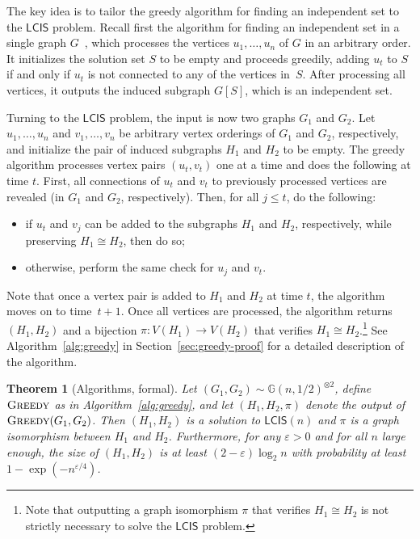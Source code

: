 \documentclass[11pt]{article}
\theoremstyle{plain}
\newtheorem{theorem}{Theorem}
\theoremstyle{definition}
\theoremstyle{remark}
\newcommand{\Gnhalf}{\mathbb{G}(n,1/2)}
\newcommand{\greedy}{\textsc{Greedy} }
\newcommand{\eps}{\varepsilon}
\newcommand{\MCS}{\mathsf{LCIS}}
\begin{document}
 
The key idea is to tailor the greedy algorithm for finding an independent set to the $\MCS$ problem. 
Recall first the algorithm for finding an independent set in a single graph $G$~\cite{grimmett1975colouring,Kar76}, 
which processes the vertices $u_{1}, \ldots, u_{n}$ of $G$ in an arbitrary order. It initializes the solution set $S$ to be empty and proceeds greedily, adding $u_{t}$ to $S$ if and only if $u_{t}$ is not connected to any of the vertices in~$S$. 
After processing all vertices, it outputs the induced subgraph $G[S]$, which is an independent set. 

Turning to the $\MCS$ problem, the input is now two graphs $G_{1}$ and $G_{2}$. 
Let $u_{1}, \ldots, u_{n}$ and 
$v_{1}, \ldots, v_{n}$ be arbitrary vertex orderings of $G_{1}$ and $G_{2}$, respectively, 
and initialize the pair of induced subgraphs $H_{1}$ and $H_{2}$ to be empty. 
The greedy algorithm processes vertex pairs $(u_{t}, v_{t})$ one at a time and does the following at time $t$. 
First, all connections of $u_{t}$ and $v_{t}$ to previously processed vertices are revealed (in $G_{1}$ and $G_{2}$, respectively). 
Then, for all $j \leq t$, do the following: 
\begin{itemize}
    \item if $u_t$ and $v_j$ can be added to the subgraphs $H_1$ and $H_2$, respectively, while preserving $H_1 \cong H_2$, then do so; 
    \item otherwise, perform the same check for $u_{j}$ and $v_{t}$.
\end{itemize}
Note that once a vertex pair is added to $H_{1}$ and $H_{2}$ at time $t$, 
the algorithm moves on to time~$t+1$. 
Once all vertices are processed, the algorithm returns $(H_{1}, H_{2})$ and a bijection $\pi : V(H_{1}) \to V(H_{2})$ 
that verifies $H_{1} \cong H_{2}$.\footnote{Note that outputting a graph isomorphism $\pi$ that verifies $H_{1} \cong H_{2}$ is not strictly necessary to solve the $\MCS$ problem.}
See Algorithm~\ref{alg:greedy} in Section~\ref{sec:greedy-proof} for a detailed description of the algorithm. 



\begin{theorem}[Algorithms, formal]\label{thm:algs-formal}
    Let $(G_1, G_2) \sim \Gnhalf^{\otimes 2}$, define $\greedy$  as in Algorithm~\ref{alg:greedy}, 
    and let $(H_1, H_2, \pi)$ denote the output of $\greedy(G_1, G_2)$. 
    Then $(H_1, H_2)$ is a solution to $\MCS(n)$ and $\pi$ is a graph isomorphism between $H_{1}$ and $H_{2}$. 
    Furthermore, for any $\eps > 0$ and for all $n$ large enough, the size of $(H_1, H_2)$ is at least $(2 - \eps)\log_2 n$ with probability at least $1 - \exp(-n^{\eps / 4})$.
\end{theorem}
\end{document}
